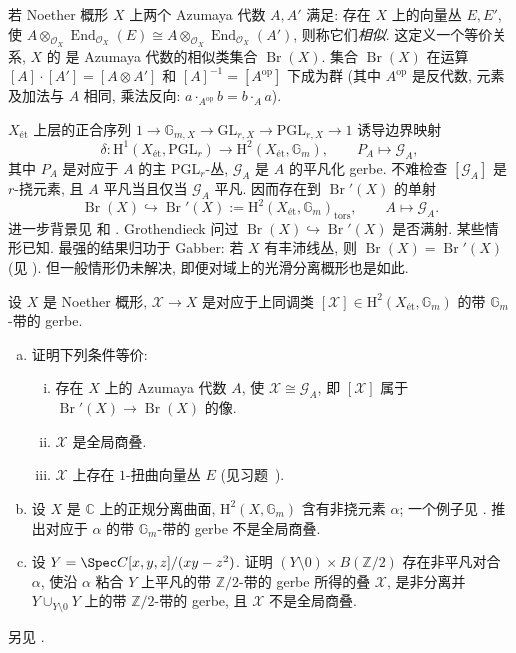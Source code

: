 \begin{remark}[Brauer 群]\label{src:7.4.51}
若 Noether 概形 $X$ 上两个 Azumaya 代数 $A,A'$ 满足: 存在 $X$ 上的向量丛 $E,E'$, 使 $A\otimes_{\mathcal O_X}\operatorname{End}_{\mathcal O_X}(E)\cong A\otimes_{\mathcal O_X}\operatorname{End}_{\mathcal O_X}(A')$, 则称它们\emph{相似}. 这定义一个等价关系, $X$ 的  是 Azumaya 代数的相似类集合 $\operatorname{Br}(X)$. 集合 $\operatorname{Br}(X)$ 在运算 $[A]\cdot[A']=[A\otimes A']$ 和 $[A]^{-1}=[A^{\mathrm{op}}]$ 下成为群 (其中 $A^{\mathrm{op}}$ 是反代数, 元素及加法与 $A$ 相同, 乘法反向: $a\cdot_{A^{\mathrm{op}}}b=b\cdot_A a$).

$X_{\text{ét}}$ 上层的正合序列 $1\to\mathbb G_{m,X}\to\mathrm{GL}_{r,X}\to\mathrm{PGL}_{r,X}\to1$ 诱导边界映射
\[
\delta:\mathrm H^1(X_{\text{ét}},\mathrm{PGL}_r)\longrightarrow\mathrm H^2(X_{\text{ét}},\mathbb G_m),\qquad P_A\longmapsto\mathcal G_A,
\]
其中 $P_A$ 是对应于 $A$ 的主 $\mathrm{PGL}_r$-丛, $\mathcal G_A$ 是 $A$ 的平凡化 gerbe. 不难检查 $[\mathcal G_A]$ 是 $r$-挠元素, 且 $A$ 平凡当且仅当 $\mathcal G_A$ 平凡. 因而存在到 $\operatorname{Br}'(X)$ 的单射
\[
\operatorname{Br}(X)\hookrightarrow\operatorname{Br}'(X):=\mathrm H^2(X_{\text{ét}},\mathbb G_m)_{\mathrm{tors}},\qquad A\longmapsto\mathcal G_A.
\]
进一步背景见 \cite{Gro68} 和 \cite[\S IV.2]{Mil80}. Grothendieck 问过 $\operatorname{Br}(X)\hookrightarrow\operatorname{Br}'(X)$ 是否满射. 某些情形已知. 最强的结果归功于 Gabber: 若 $X$ 有丰沛线丛, 则 $\operatorname{Br}(X)=\operatorname{Br}'(X)$ (见 \cite{dJ03}). 但一般情形仍未解决, 即便对域上的光滑分离概形也是如此.
\end{remark}
\begin{exercise}\label{src:7.4.52}
设 $X$ 是 Noether 概形, $\mathcal X\to X$ 是对应于上同调类 $[\mathcal X]\in\mathrm H^2(X_{\text{ét}},\mathbb G_m)$ 的带 $\mathbb G_m$-带的 gerbe.
\begin{enumerate}[(a)]
\item 证明下列条件等价:
\begin{enumerate}[(i)]
\item 存在 $X$ 上的 Azumaya 代数 $A$, 使 $\mathcal X\cong\mathcal G_A$, 即 $[\mathcal X]$ 属于 $\operatorname{Br}'(X)\to\operatorname{Br}(X)$ 的像.
\item $\mathcal X$ 是全局商叠.
\item $\mathcal X$ 上存在 $1$-扭曲向量丛 $E$ (见习题~).
\end{enumerate}
\item 设 $X$ 是 $\mathbb C$ 上的正规分离曲面, $\mathrm H^2(X,\mathbb G_m)$ 含有非挠元素 $\alpha$; 一个例子见 \cite[II.1.11.b]{Gro68}. 推出对应于 $\alpha$ 的带 $\mathbb G_m$-带的 gerbe 不是全局商叠.
\item 设 $Y=\Spec\mathbb C[x,y,z]/(xy-z^2)$. 证明 $(Y\setminus0)\times B(\mathbb Z/2)$ 存在非平凡对合 $\alpha$, 使沿 $\alpha$ 粘合 $Y$ 上平凡的带 $\mathbb Z/2$-带的 gerbe 所得的叠 $\mathcal X$, 是非分离并 $Y\cup_{Y\setminus0}Y$ 上的带 $\mathbb Z/2$-带的 gerbe, 且 $\mathcal X$ 不是全局商叠.
\end{enumerate}
另见 \cite{EHKV01}.
\end{exercise}
